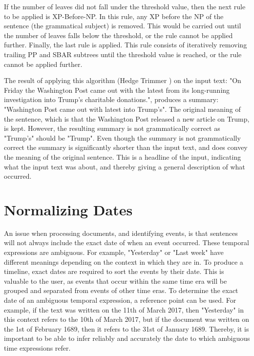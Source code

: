 \par If the number of leaves did not fall under the threshold value, then the next rule to be applied is XP-Before-NP. In this rule, any XP before the NP of the sentence (the grammatical subject) is removed. This would be carried out until the number of leaves falls below the threshold, or the rule cannot be applied further. Finally, the last rule is applied.  This rule consists of iteratively removing trailing PP and SBAR subtrees until the threshold value is reached, or the rule cannot be applied further. 
\par The result of applying this algorithm (Hedge Trimmer  \cite{dorrzajicschwartz2003}) on the input text: "On Friday the Washington Post came out with the latest from its long-running investigation into Trump's charitable donations.", produces a summary: "Washington Post came out with latest into Trump's". The original meaning of the sentence, which is that the Washington Post released a new article on Trump, is kept. However, the resulting summary is not grammatically correct as "Trump's" should be "Trump". Even though the summary is not grammatically correct the summary is significantly shorter than the input text, and does convey the meaning of the original sentence. This is a headline of the input, indicating what the input text was about, and thereby giving a general description of what occurred.

\section{Normalizing Dates}
\par An issue when processing documents, and identifying events, is that sentences will not always include the exact date of when an event occurred. These temporal expressions are ambiguous. For example, "Yesterday" or "Last week" have different meanings depending on the context in which they are in. To produce a timeline, exact dates are required to sort the events by their date. This is valuable to the user, as events that occur within the same time era will be grouped and separated from events of other time eras. To determine the exact date of an ambiguous temporal expression, a reference point can be used. For example, if the text was written on the 11th of March 2017, then "Yesterday" in this context refers to the 10th of March 2017, but if the document was written on the 1st of February 1689, then it refers to the 31st of January 1689. Thereby, it is important to be able to infer reliably and accurately the date to which ambiguous time expressions refer. 

